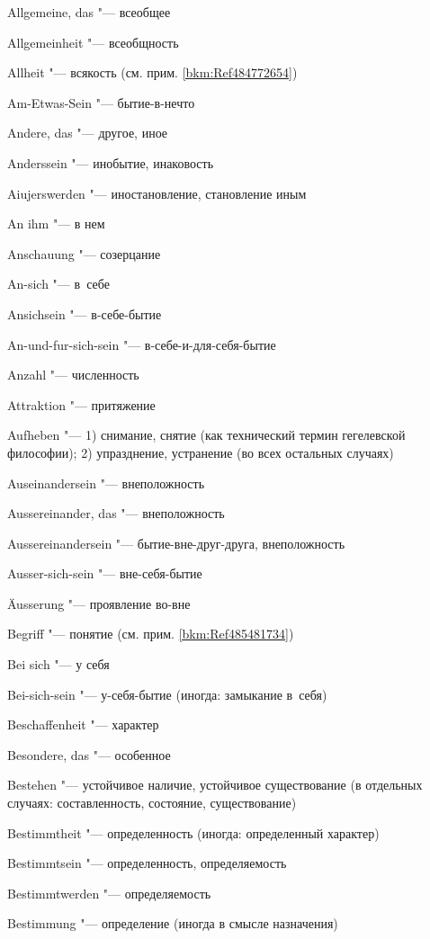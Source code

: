 \begin{multicols}{2}
Allgemeine, das "--- всеобщее

Allgemein\-heit "--- всеобщность

Allheit "--- всякость (см. прим. \ref{bkm:Ref484772654})

Am-Etwas-Sein "--- бытие-в-нечто

Andere, das "--- другое, иное

Anderssein "--- инобытие, инаковость

Aiujers\-werden "--- иностановление, становление иным

An ihm "--- в нем

Anschauung "--- созерцание

An-sich "--- в~себе

Ansichsein "--- в-себе-бытие

An-und-fur-sich-sein "--- в-себе-и-для-себя-бытие

Anzahl "--- численность

Attraktion "--- притяжение

Aufheben "--- 1) снимание, снятие (как технический термин гегелевской
философии); 2) упразднение, устранение (во всех остальных случаях)

Ausein\-ander\-sein "--- внеположность

Ausser\-ein\-ander, das "--- внеположность

Ausser\-ein\-ander\-sein "--- бытие-вне-друг-друга, внеположность

Ausser-sich-sein "--- вне-себя-бытие

Äusserung "--- проявление во-вне

\bigskip

Begriff "--- понятие (см. прим. \ref{bkm:Ref485481734})

Bei sich "--- у себя

Bei-sich-sein "--- у-себя-бытие (иногда: замыкание в~себя)

Beschaffen\-heit "--- характер

Besondere, das "--- особенное

Bestehen "--- устойчивое наличие, устойчивое существование (в
отдельных случаях: составленность, состояние, существование)

Bestimmtheit "--- определенность (иногда: определенный характер)

Bestimmtsein "--- определенность, определяемость

Bestimmt\-werden "--- определяемость

Bestimmung "--- определение (иногда в смысле назначения)


\end{multicols}
